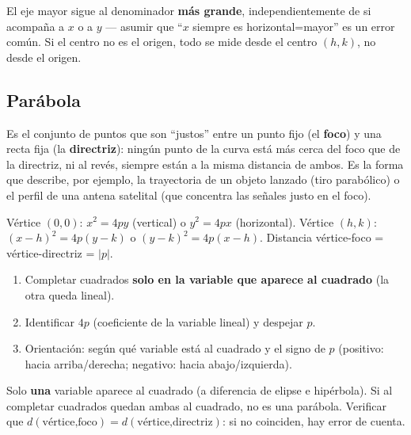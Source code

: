 \documentclass[11pt,a4paper]{article}
\begin{document}
\begin{atencion}
El eje mayor sigue al denominador \textbf{más grande}, independientemente de si acompaña
a $x$ o a $y$ — asumir que ``$x$ siempre es horizontal=mayor'' es un error común. Si el
centro no es el origen, todo se mide desde el centro $(h,k)$, no desde el origen.
\end{atencion}

\subsection{Parábola}

\begin{intuicion}
Es el conjunto de puntos que son ``justos'' entre un punto fijo (el \textbf{foco}) y una
recta fija (la \textbf{directriz}): ningún punto de la curva está más cerca del foco que
de la directriz, ni al revés, siempre están a la misma distancia de ambos. Es la forma
que describe, por ejemplo, la trayectoria de un objeto lanzado (tiro parabólico) o el
perfil de una antena satelital (que concentra las señales justo en el foco).
\end{intuicion}

\begin{teoria}
Vértice $(0,0)$: $x^2=4py$ (vertical) o $y^2=4px$ (horizontal). Vértice $(h,k)$:
$(x-h)^2=4p(y-k)$ o $(y-k)^2=4p(x-h)$. Distancia vértice-foco = vértice-directriz = $|p|$.
\end{teoria}

\begin{proc}
\begin{enumerate}
    \item Completar cuadrados \textbf{solo en la variable que aparece al cuadrado} (la
    otra queda lineal).
    \item Identificar $4p$ (coeficiente de la variable lineal) y despejar $p$.
    \item Orientación: según qué variable está al cuadrado y el signo de $p$ (positivo:
    hacia arriba/derecha; negativo: hacia abajo/izquierda).
\end{enumerate}
\end{proc}

\begin{atencion}
Solo \textbf{una} variable aparece al cuadrado (a diferencia de elipse e hipérbola). Si al
completar cuadrados quedan ambas al cuadrado, no es una parábola. Verificar que
$d(\text{vértice,foco})=d(\text{vértice,directriz})$: si no coinciden, hay error de
cuenta.
\end{atencion}
\end{document}
